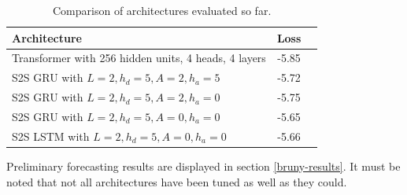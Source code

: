 \begin{table}[htbp]
	\centering
	\begin{tabular}{lcl}
		\hline
		\textbf{Architecture} & \textbf{Loss} & \\
		\hline
		Transformer with 256 hidden units, 4 heads, 4 layers   &  -5.85  &  \\
		S2S GRU with  $L = 2, h_d = 5, A=2, h_a=5$ &  -5.72  &  \\
		S2S GRU with  $L = 2, h_d = 5, A=2, h_a=0$  &  -5.75  &  \\
		S2S GRU with  $L = 2, h_d = 5, A=0, h_a=0$  &  -5.65  &  \\
		S2S LSTM with  $L = 2, h_d = 5, A=0, h_a=0$  &  -5.66  &  \\
		\hline
	\end{tabular}
	\caption{Comparison of architectures evaluated so far.}
	\label{tab:architecture_comparison}
\end{table}

Preliminary forecasting results are displayed in section \ref{bruny-results}.
It must be noted that not all architectures have been tuned as well as they could.



	